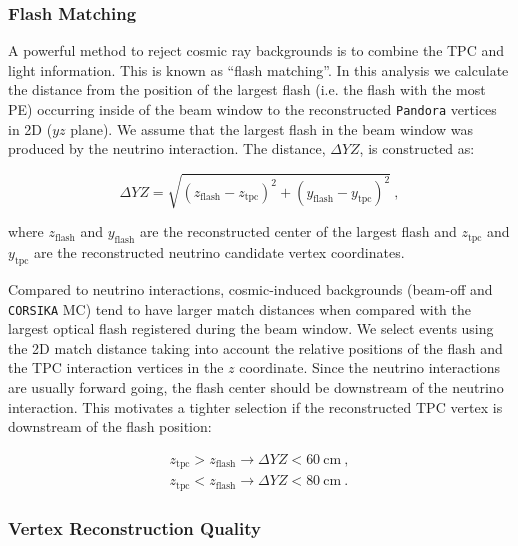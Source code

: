 \subsubsection{Flash Matching}
A powerful method to reject cosmic ray backgrounds is to combine the TPC and light information. This is known as ``flash matching''.
In this analysis we calculate the distance from the position of the largest flash (i.e. the flash with the most PE) occurring inside of the beam window to the reconstructed \texttt{Pandora} vertices in 2D ($yz$ plane). We assume that the largest flash in the beam window was produced by the neutrino interaction. The distance, ${\Delta Y\!Z}$, is constructed as:

\begin{equation}
\Delta Y\!Z = \sqrt{(z_{\text{flash}} - z_{\text{tpc}})^{2} + (y_{\text{flash}} - y_{\text{tpc}})^{2}}~,
\end{equation}

\noindent where $z_{\text{flash}}$ and $y_{\text{flash}}$ are the reconstructed center of the largest flash and $z_{\text{tpc}}$ and $y_{\text{tpc}}$ are the reconstructed neutrino candidate vertex coordinates. 

Compared to neutrino interactions, cosmic-induced backgrounds (beam-off and \texttt{CORSIKA} MC) tend to have larger match distances when compared with the largest optical flash registered during the beam window. We select events using the 2D match distance taking into account the relative positions of the flash and the TPC interaction vertices in the $z$ coordinate. Since the neutrino interactions are usually forward going, the flash center should be downstream of the neutrino interaction. This motivates a tighter selection if the reconstructed TPC vertex is downstream of the flash position:

\begin{equation}
\begin{split}
z_{\text{tpc}} > z_{\text{flash}} \rightarrow \Delta Y\!Z < 60~\textrm{cm}~,\\
z_{\text{tpc}} < z_{\text{flash}} \rightarrow \Delta Y\!Z < 80~\textrm{cm}~.
\end{split}
\end{equation}

\subsubsection{Vertex Reconstruction Quality}

